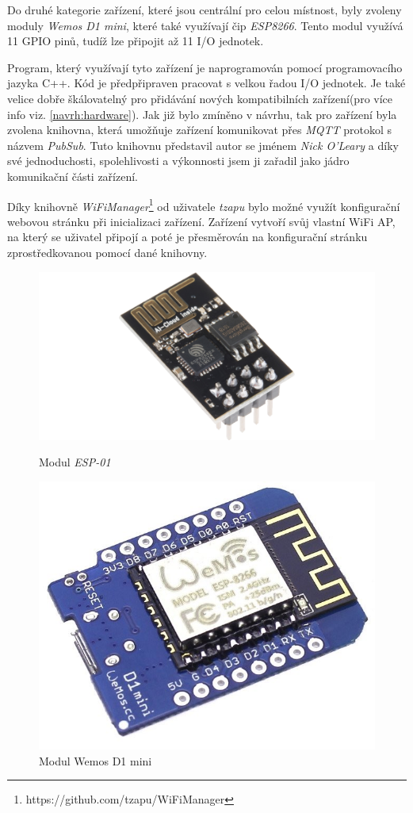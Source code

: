 Do druhé kategorie zařízení, které jsou centrální pro celou místnost, byly zvoleny moduly \emph{Wemos D1 mini}, které také využívají čip \emph{ESP8266}.
Tento modul využívá 11 GPIO pinů, tudíž lze připojit až 11 I/O jednotek.

Program, který využívají tyto zařízení je naprogramován pomocí programovacího jazyka C++.
Kód je předpřipraven pracovat s velkou řadou I/O jednotek.
Je také velice dobře škálovatelný pro přidávání nových kompatibilních zařízení(pro více info viz. \ref{navrh:hardware}).
Jak již bylo zmíněno v návrhu, tak pro zařízení byla zvolena knihovna, která umožňuje zařízení komunikovat přes \emph{MQTT} protokol s názvem \emph{PubSub}.
Tuto knihovnu představil autor se jménem \emph{Nick O'Leary} a díky své jednoduchosti, spolehlivosti a výkonnosti jsem ji zařadil jako jádro komunikační části zařízení.

Díky knihovně \emph{WiFiManager}\footnote{https://github.com/tzapu/WiFiManager} od uživatele \emph{tzapu} bylo možné využít konfigurační webovou stránku při inicializaci zařízení.
Zařízení vytvoří svůj vlastní WiFi AP, na který se uživatel připojí a poté je přesměrován na konfigurační stránku zprostředkovanou pomocí dané knihovny.

\begin{figure}[hbt]
  \centering
  \includegraphics[width=.8\linewidth]{obrazky-figures/esp-01.png}
  \caption{Modul \emph{ESP-01}}
  \label{figure:esp01}
  \endminipage

  \hfill
  \centering
  \includegraphics[width=.7\linewidth]{obrazky-figures/wemos.jpg}
  \caption{Modul Wemos D1 mini}
  \label{figure:wemos}
  \endminipage
\end{figure}

